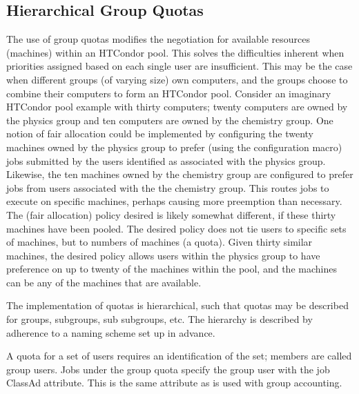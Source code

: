 \subsection{\label{sec:group-quotas}Hierarchical Group Quotas}

The use of group quotas modifies the negotiation for 
available resources (machines) within an HTCondor pool.
This solves the difficulties inherent when
priorities assigned based on each single user are insufficient.
This may be the case when
different groups (of varying size) own computers,
and the groups choose to combine their computers to
form an HTCondor pool.
Consider an imaginary HTCondor pool example with thirty computers;
twenty computers are owned by the physics group and ten
computers are owned by the chemistry group.
One notion of fair allocation could be implemented 
by configuring the twenty machines owned by the physics group
to prefer (using the  configuration macro)
jobs submitted by the users identified as associated
with the physics group.
Likewise, the ten machines owned by the chemistry group are
configured to prefer jobs from users associated with the
the chemistry group.
This routes jobs to execute on specific machines,
perhaps causing more preemption than necessary.
The (fair allocation) policy desired is likely somewhat different,
if these thirty machines have been pooled.
The desired policy does not tie users to specific sets of machines,
but to numbers of machines (a quota).
Given thirty similar machines,
the desired policy allows users within the physics group to have
preference on up to twenty of the machines within the pool,
and the machines can be any of the machines that are available.

The implementation of quotas is hierarchical,
such that quotas may be described for groups, subgroups,
sub subgroups, etc.  
The hierarchy is described by adherence to a naming scheme
set up in advance.

A quota for a set of users requires an identification of
the set; members are called group users.
Jobs under the group quota specify the group user with the
 job ClassAd attribute.
This is the same attribute as is used with group accounting.

